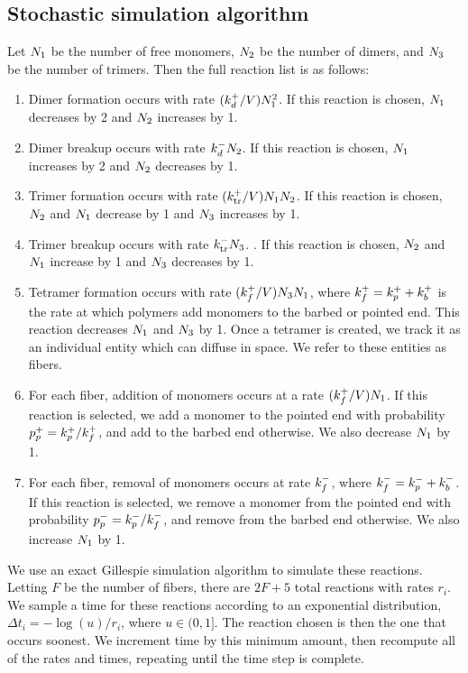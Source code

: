 \documentclass[11pt]{article}
\begin{document}
\subsection{Stochastic simulation algorithm \label{sec:SSA}}
Let $N_1$ be the number of free monomers, $N_2$ be the number of dimers, and $N_3$ be the number of trimers. Then the full reaction list is as follows:
\begin{enumerate}
\item Dimer formation occurs with rate $(k_d^+/V)N_1^2$. If this reaction is chosen, $N_1$ decreases by 2 and $N_2$ increases by 1. 
\item Dimer breakup occurs with rate $k_d^- N_2$. If this reaction is chosen, $N_1$ increases by 2 and $N_2$ decreases by 1. 
\item Trimer formation occurs with rate $(k_\text{tr}^+/V)N_1 N_2 $. If this reaction is chosen, $N_2$ and $N_1$ decrease by 1 and $N_3$ increases by 1. 
\item Trimer breakup occurs with rate $k_\text{tr}^- N_3$. . If this reaction is chosen, $N_2$ and $N_1$ increase by 1 and $N_3$ decreases by 1. 
\item Tetramer formation occurs with rate $(k_f^+/V) N_3 N_1$, where $k_f^+=k_p^++k_b^+$ is the rate at which polymers add monomers to the barbed or pointed end. This reaction decreases $N_1$ and $N_3$ by 1. Once a tetramer is created, we track it as an individual entity which can diffuse in space. We refer to these entities as fibers. 
\item For each fiber, addition of monomers occurs at a rate $(k_f^+/V) N_1$. If this reaction is selected, we add a monomer to the pointed end with probability $p_p^+= k_p^+/k_f^+$, and add to the barbed end otherwise. We also decrease $N_1$ by 1. 
\item For each fiber, removal of monomers occurs at rate $k_f^-$, where $k_f^-=k_p^-+k_b^-$.  If this reaction is selected, we remove a monomer from the pointed end with probability $p_p^-=k_p^-/k_f^-$, and remove from the barbed end otherwise. We also increase $N_1$ by 1. 
\end{enumerate}
We use an exact Gillespie simulation algorithm \cite{gillespie2007stochastic} to simulate these reactions. Letting $F$ be the number of fibers, there are $2F+5$ total reactions with rates $r_i$. We sample a time for these reactions according to an exponential distribution, $\Delta t_i=-\log(u)/r_i$, where $u \in (0,1]$. The reaction chosen is then the one that occurs soonest. We increment time by this minimum amount, then recompute all of the rates and times, repeating until the time step is complete.
\end{document}
